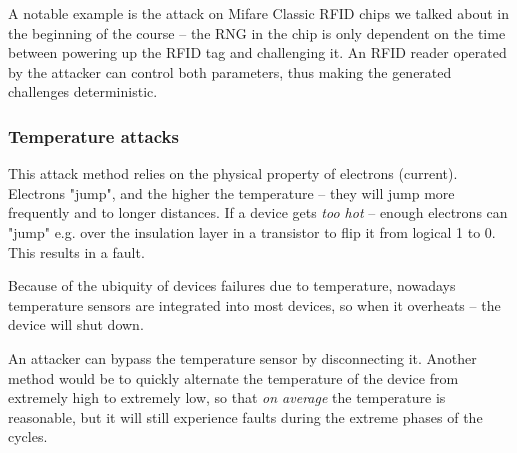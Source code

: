 A notable example is the attack on Mifare Classic RFID chips we talked about in the beginning of the course \cite{bib:nohl2008} -- the RNG in the chip is only dependent on the time between powering up the RFID tag and challenging it. An RFID reader operated by the attacker can control both parameters, thus making the generated challenges deterministic.

\subsubsection{Temperature attacks}
This attack method relies on the physical property of electrons (current). Electrons  "jump", and the higher the temperature -- they will jump more frequently and to longer distances.
If a device gets \emph{too hot} -- enough electrons can "jump" e.g. over the insulation layer in a transistor to flip it from logical 1 to 0. This results in a fault.

Because of the ubiquity of devices failures due to temperature, nowadays temperature sensors are integrated into most devices, so when it overheats -- the device will shut down.

An attacker can bypass the temperature sensor by disconnecting it. Another method would be to quickly alternate the temperature of the device from extremely high to extremely low, so that \emph{on average} the temperature is reasonable, but it will still experience faults during the extreme phases of the cycles.

